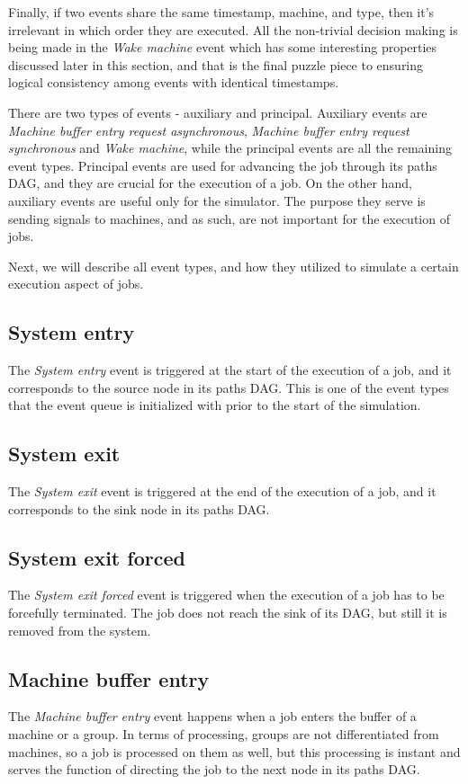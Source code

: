 Finally, if two events share the same timestamp, machine, and type, then it's irrelevant in which order they are executed. All the non-trivial decision making is being made in the \textit{Wake machine} event which has some interesting properties discussed later in this section, and that is the final puzzle piece to ensuring logical consistency among events with identical timestamps.

There are two types of events - auxiliary and principal. Auxiliary events are \textit{Machine buffer entry request asynchronous}, \textit{Machine buffer entry request synchronous} and \textit{Wake machine}, while the principal events are all the remaining event types. Principal events are used for advancing the job through its paths DAG, and they are crucial for the execution of a job. On the other hand, auxiliary events are useful only for the simulator. The purpose they serve is sending signals to machines, and as such, are not important for the execution of jobs.

Next, we will describe all event types, and how they utilized to simulate a certain execution aspect of jobs.

\subsection{System entry}
The \textit{System entry} event is triggered at the start of the execution of a job, and it corresponds to the source node in its paths DAG. This is one of the event types that the event queue is initialized with prior to the start of the simulation.

\subsection{System exit}
The \textit{System exit} event is triggered at the end of the execution of a job, and it corresponds to the sink node in its paths DAG.

\subsection{System exit forced}
The \textit{System exit forced} event is triggered when the execution of a job has to be forcefully terminated. The job does not reach the sink of its DAG, but still it is removed from the system.

\subsection{Machine buffer entry}
The \textit{Machine buffer entry} event happens when a job enters the buffer of a machine or a group. In terms of processing, groups are not differentiated from machines, so a job is processed on them as well, but this processing is instant and serves the function of directing the job to the next node in its paths DAG.

